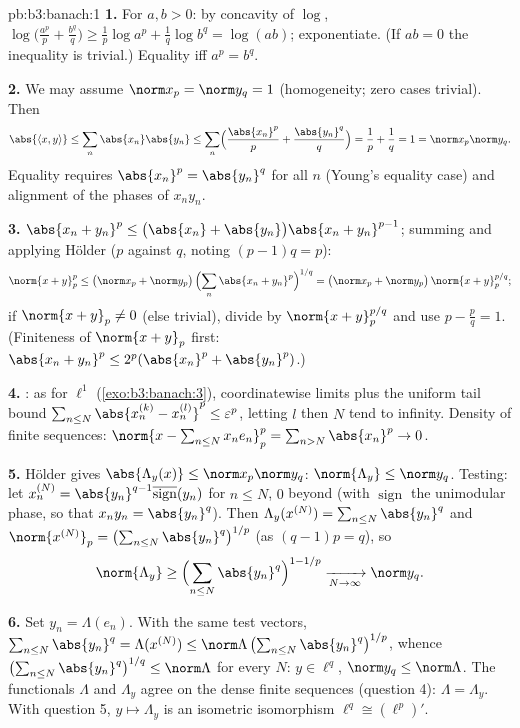 \begin{solution}{pb:b3:banach:1}
\textbf{1.} For $a, b > 0$: by concavity of $\log$,
$\log\bigl(\tfrac{a^p}p + \tfrac{b^q}q\bigr) \geq \tfrac1p\log
a^p + \tfrac1q\log b^q = \log(ab)$; exponentiate. (If $ab = 0$
the inequality is trivial.) Equality iff $a^p = b^q$.

\textbf{2.} We may assume $\norm x_p = \norm y_q = 1$
(homogeneity; zero cases trivial). Then
\[
\abs{\langle x, y\rangle} \leq \sum_n\abs{x_n}\abs{y_n}
\leq \sum_n\Bigl(\frac{\abs{x_n}^p}p +
\frac{\abs{y_n}^q}q\Bigr) = \frac1p + \frac1q = 1 =
\norm x_p\norm y_q .
\]
Equality requires $\abs{x_n}^p = \abs{y_n}^q$ for all $n$
(Young's equality case) and alignment of the phases of
$x_ny_n$.

\textbf{3.} $\abs{x_n + y_n}^p \leq \bigl(\abs{x_n} +
\abs{y_n}\bigr)\abs{x_n + y_n}^{p-1}$; summing and applying
H\"older ($p$ against $q$, noting $(p - 1)q = p$):
\[
\norm{x + y}_p^p \leq \bigl(\norm x_p + \norm
y_p\bigr)\,\Bigl(\sum_n\abs{x_n + y_n}^{p}\Bigr)^{1/q}
= \bigl(\norm x_p + \norm y_p\bigr)\,\norm{x+y}_p^{p/q};
\]
if $\norm{x + y}_p \neq 0$ (else trivial), divide by
$\norm{x+y}_p^{p/q}$ and use $p - \frac pq = 1$. (Finiteness of
$\norm{x+y}_p$ first: $\abs{x_n+y_n}^p \leq
2^p(\abs{x_n}^p + \abs{y_n}^p)$.)

\textbf{4.} : as for $\ell^1$
(\cref{exo:b3:banach:3}), coordinatewise limits plus the
uniform tail bound $\sum_{n\leq N}\abs{x^{(k)}_n - x^{(l)}_n}^p
\leq \varepsilon^p$, letting $l$ then $N$ tend to infinity.
Density of finite sequences: $\norm{x - \sum_{n\leq
N}x_ne_n}_p^p = \sum_{n > N}\abs{x_n}^p \to 0$.

\textbf{5.} H\"older gives $\abs{\Lambda_y(x)} \leq \norm
x_p\norm y_q$: $\norm{\Lambda_y} \leq \norm y_q$. Testing: let
$x^{(N)}_n = \abs{y_n}^{q-1}\overline{\operatorname{sign}}(y_n)$
for $n \leq N$, $0$ beyond (with $\operatorname{sign}$ the
unimodular phase, so that $x_ny_n = \abs{y_n}^q$). Then
$\Lambda_y(x^{(N)}) = \sum_{n\leq N}\abs{y_n}^q$ and
$\norm{x^{(N)}}_p = \bigl(\sum_{n\leq
N}\abs{y_n}^{q}\bigr)^{1/p}$ (as $(q-1)p = q$), so
\[
\norm{\Lambda_y} \geq \Bigl(\sum_{n\leq
N}\abs{y_n}^q\Bigr)^{1 - 1/p} \xrightarrow[N\to\infty]{}
\norm y_q .
\]

\textbf{6.} Set $y_n = \Lambda(e_n)$. With the same test
vectors, $\sum_{n \leq N}\abs{y_n}^q = \Lambda(x^{(N)}) \leq
\norm\Lambda\,\bigl(\sum_{n\leq N}\abs{y_n}^q\bigr)^{1/p}$,
whence $\bigl(\sum_{n\leq N}\abs{y_n}^q\bigr)^{1/q} \leq
\norm\Lambda$ for every $N$: $y \in \ell^q$, $\norm y_q \leq
\norm\Lambda$. The functionals $\Lambda$ and $\Lambda_y$ agree
on the dense finite sequences (question 4): $\Lambda =
\Lambda_y$. With question 5, $y \mapsto \Lambda_y$ is an
isometric isomorphism $\ell^q \cong (\ell^p)'$.


\end{solution}
